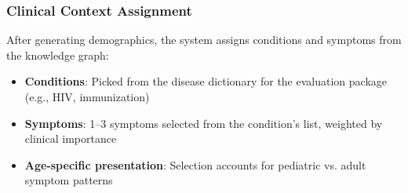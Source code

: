 \subsubsection{Clinical Context Assignment}

After generating demographics, the system assigns conditions and symptoms from the knowledge graph:
\begin{itemize}
    \item \textbf{Conditions}: Picked from the disease dictionary for the evaluation package (e.g., HIV, immunization)
    \item \textbf{Symptoms}: 1--3 symptoms selected from the condition's list, weighted by clinical importance
    \item \textbf{Age-specific presentation}: Selection accounts for pediatric vs. adult symptom patterns
\end{itemize}
